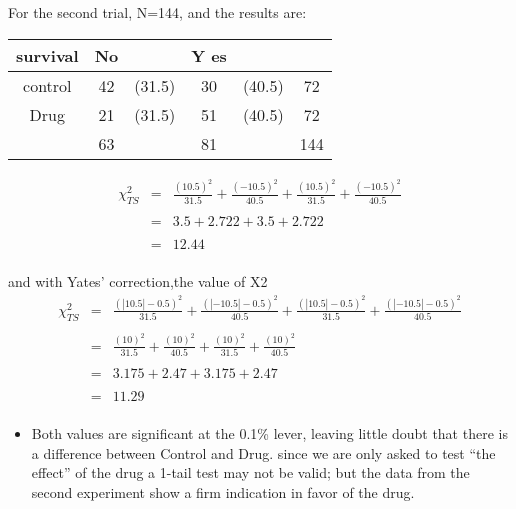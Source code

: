 \documentclass[a4paper,12pt]{article}
\begin{document}
\item 
For the second trial, N=144, and the results are:

\begin{center}
\begin{tabular}{|c|cc|cc|c|} \hline
survival & No & & Y es & & \\ \hline
control & 42& (31.5)& 30&(40.5)& 72 \\ \hline
Drug & 21&(31.5) & 51&(40.5) & 72 \\ \hline
& 63& &  81& &  144 \\ \hline
\end{tabular}
\end{center}



\begin{eqnarray*}
\chi^2_{TS} &=& \frac{(10.5)^2}{31.5} + \frac{(-10.5)^2}{40.5} + \frac{(10.5)^2}{31.5} + \frac{(-10.5)^2}{40.5}\\
& & \\
&=& 3.5 + 2.722 + 3.5 + 2.722 \\
& & \\
&=& 12.44 \\
\end{eqnarray*}

and with Yates’ correction,the value of X2
\begin{eqnarray*}
\chi^2_{TS} &=& \frac{(|10.5|-0.5)^2}{31.5} + \frac{(|-10.5|-0.5)^2}{40.5} + \frac{(|10.5|-0.5)^2}{31.5} + \frac{(|-10.5|-0.5)^2}{40.5}\\
& & \\
&=& \frac{(10)^2}{31.5} + \frac{(10)^2}{40.5} + \frac{(10)^2}{31.5} + \frac{(10)^2}{40.5}\\
& & \\
&=& 3.175 + 2.47 + 3.175 + 2.47 \\
& & \\
&=& 11.29 \\
\end{eqnarray*}


\begin{itemize}
    \item Both values are significant at the 0.1\% lever, leaving little doubt that there is a difference
between Control and Drug.
since we are only asked to test ``the effect” of the drug a 1-tail test may not be valid;
but the data from the second experiment show a firm indication in favor of the drug.
\end{itemize}
\end{document}
